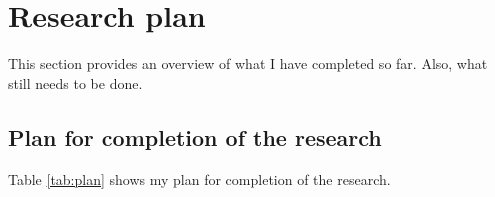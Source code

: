 \documentclass[12pt]{article}
\begin{document}
%
%
%
%
%
%
%
%

\section{Research plan}
\label{ch:plan}

This section provides an overview of what I have completed so far. Also, what still needs to be done.

\subsection{Plan for completion of the research}

Table \ref{tab:plan} shows my plan for completion of the research.
\end{document}
